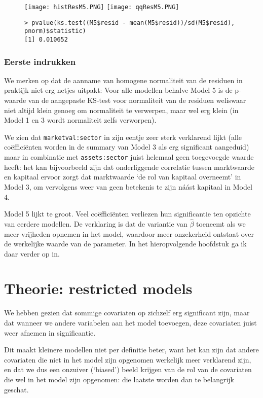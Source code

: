 \documentclass[a4paper, notitlepage]{report}
\begin{document}
  \begin{figure}
  \begin{center}
    \texttt{[image: histResM5.PNG]}
    \texttt{[image: qqResM5.PNG]}
  \end{center}
  \begin{verbatim}
> pvalue(ks.test((M5$resid - mean(M5$resid))/sd(M5$resid), pnorm)$statistic)
[1] 0.010652
  \end{verbatim}
  \end{figure}
  
\subsection{Eerste indrukken}
  We merken op dat de aanname van homogene normaliteit van de residuen in praktijk niet erg netjes uitpakt: Voor alle modellen behalve Model 5 is de p-waarde van de aangepaste KS-test voor normaliteit van de residuen weliswaar niet altijd klein genoeg om normaliteit te verwerpen, maar wel erg klein (in Model 1 en 3 wordt normaliteit zelfs verworpen).
  
  We zien dat \verb!marketval:sector! in zijn eentje zeer sterk verklarend lijkt (alle co\"effici\"enten worden in de summary van Model 3 als erg significant aangeduid) maar in combinatie met \verb!assets:sector! juist helemaal geen toegevoegde waarde heeft: het kan bijvoorbeeld zijn dat onderliggende correlatie tussen marktwaarde en kapitaal ervoor zorgt dat marktwaarde `de rol van kapitaal overneemt' in Model 3, om vervolgens weer van geen betekenis te zijn n\' a\' ast kapitaal in Model 4.
  
  Model 5 lijkt te groot. Veel co\"effici\"enten verliezen hun significantie ten opzichte van eerdere modellen. De verklaring is dat de variantie van $\hat{\beta}$ toeneemt als we meer vrijheden opnemen in het model, waardoor meer onzekerheid ontstaat over de werkelijke waarde van de parameter. In het hieropvolgende hoofdstuk ga ik daar verder op in.

\chapter*{Theorie: restricted models}
  We hebben gezien dat sommige covariaten op zichzelf erg significant zijn, maar dat wanneer we andere variabelen aan het model toevoegen, deze covariaten juist weer afnemen in significantie. 
  
  Dit maakt kleinere modellen niet per definitie beter, want het kan zijn dat andere covariaten die niet in het model zijn opgenomen werkelijk meer verklarend zijn, en dat we dus een onzuiver (`biased') beeld krijgen van de rol van de covariaten die wel in het model zijn opgenomen: die laatste worden dan te belangrijk geschat. 
  
\end{document}
